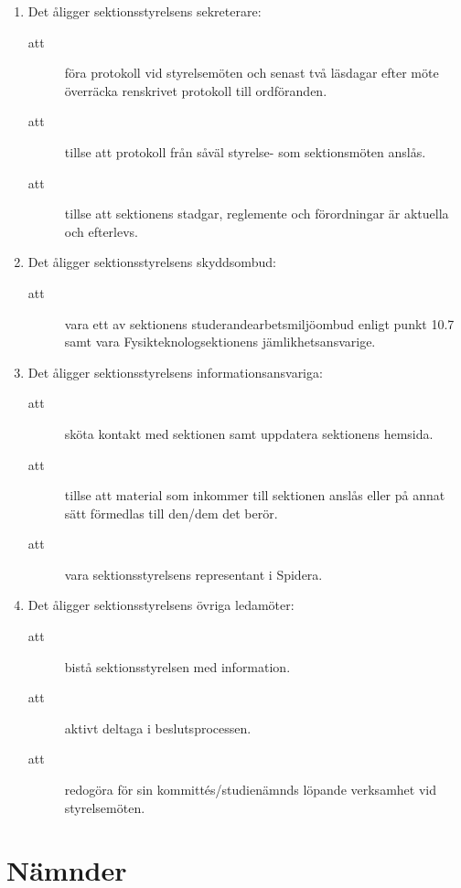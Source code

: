 \documentclass[11pt,a4paper]{article}
\begin{document}
\begin{enumerate}[\thesubsection .1]
  \item Det åligger sektionsstyrelsens sekreterare:
    \begin{description}
      \item[att] föra protokoll vid styrelsemöten och senast två läsdagar efter möte överräcka renskrivet protokoll till ordföranden.
      \item[att] tillse att protokoll från såväl styrelse- som sektionsmöten anslås.
      \item[att] tillse att sektionens stadgar, reglemente och förordningar är aktuella och efterlevs.
    \end{description}

  \item Det åligger sektionsstyrelsens skyddsombud:
    \begin{description}
      \item[att] vara ett av sektionens studerandearbetsmiljöombud
      enligt punkt 10.7 samt vara Fys\-ik\-teknolog\-sektionens jämlikhetsansvarige.
    \end{description}
    
  \item Det åligger sektionsstyrelsens informationsansvariga:  
    \begin{description}
      \item[att] sköta kontakt med sektionen samt uppdatera sektionens hemsida. 
      \item[att] tillse att material som inkommer till sektionen anslås eller på annat sätt förmedlas  till den/dem det berör.
      \item[att] vara sektionsstyrelsens representant i Spidera.
    \end{description}    

  \item Det åligger sektionsstyrelsens  övriga ledamöter:
    \begin{description}
      \item[att] bistå sektionsstyrelsen med information.
      \item[att] aktivt deltaga i beslutsprocessen.
      \item[att] redogöra för sin kommittés/studienämnds löpande verksamhet vid styrel\-se\-möten.
      
    \end{description}
\end{enumerate}


\newpage

\section{Nämnder}
\end{document}
